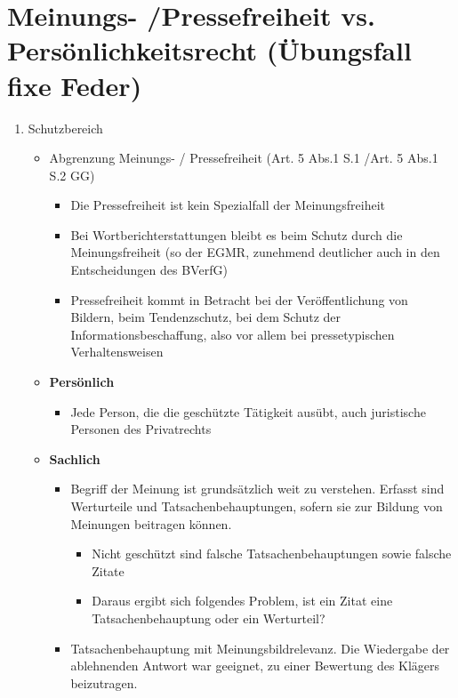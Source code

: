 \section{Meinungs- /Pressefreiheit vs. Persönlichkeitsrecht (Übungsfall fixe Feder)}
\begin{enumerate}[label={\roman*)}]
    \item Schutzbereich
    \begin{itemize}
        \item Abgrenzung Meinungs- / Pressefreiheit (Art. 5 Abs.1 S.1 /Art. 5 Abs.1 S.2 GG)
        \begin{itemize}
            \item Die Pressefreiheit ist kein Spezialfall der Meinungsfreiheit
            \item Bei Wortberichterstattungen bleibt es beim Schutz durch die Meinungsfreiheit (so der EGMR, zunehmend deutlicher auch in den Entscheidungen des BVerfG)
            \item Pressefreiheit kommt in Betracht bei der Veröffentlichung von Bildern, beim Tendenzschutz, bei dem Schutz der Informationsbeschaffung, also vor allem bei pressetypischen Verhaltensweisen
        \end{itemize}
        \item \textbf{Persönlich}
        \begin{itemize}
            \item Jede Person, die die geschützte Tätigkeit ausübt, auch juristische Personen des Privatrechts
        \end{itemize}
        \item \textbf{Sachlich}
        \begin{itemize}
            \item Begriff der Meinung ist 
grundsätzlich weit zu verstehen. Erfasst sind Werturteile und Tatsachenbehauptungen, sofern sie zur Bildung von Meinungen beitragen können. 
            \begin{itemize}
                \item Nicht geschützt sind falsche Tatsachenbehauptungen sowie falsche Zitate
                \item Daraus ergibt sich folgendes Problem, ist ein Zitat eine Tatsachenbehauptung oder ein Werturteil?
            \end{itemize}
            \item Tatsachenbehauptung mit Meinungsbildrelevanz. Die Wiedergabe der ablehnenden Antwort war geeignet, zu einer Bewertung des Klägers beizutragen. 

\end{itemize}
\end{itemize}
\end{enumerate}
